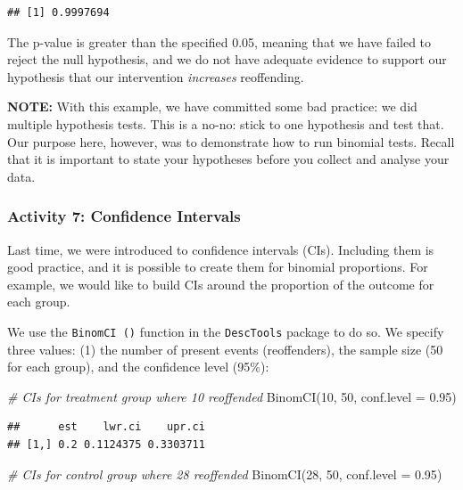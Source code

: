 \documentclass[
]{book}
\newenvironment{Shaded}{\begin{snugshade}}{\end{snugshade}}
\newcommand{\AttributeTok}[1]{\textcolor[rgb]{0.77,0.63,0.00}{#1}}
\newcommand{\CommentTok}[1]{\textcolor[rgb]{0.56,0.35,0.01}{\textit{#1}}}
\newcommand{\DecValTok}[1]{\textcolor[rgb]{0.00,0.00,0.81}{#1}}
\newcommand{\FloatTok}[1]{\textcolor[rgb]{0.00,0.00,0.81}{#1}}
\newcommand{\FunctionTok}[1]{\textcolor[rgb]{0.00,0.00,0.00}{#1}}
\newcommand{\NormalTok}[1]{#1}
\begin{document}
\begin{verbatim}
## [1] 0.9997694
\end{verbatim}

The p-value is greater than the specified 0.05, meaning that we have failed to reject the null hypothesis, and we do not have adequate evidence to support our hypothesis that our intervention \emph{increases} reoffending.

\textbf{NOTE:} With this example, we have committed some bad practice: we did multiple hypothesis tests. This is a no-no: stick to one hypothesis and test that. Our purpose here, however, was to demonstrate how to run binomial tests. Recall that it is important to state your hypotheses before you collect and analyse your data.

\hypertarget{activity-7-confidence-intervals}{%
\subsubsection{Activity 7: Confidence Intervals}\label{activity-7-confidence-intervals}}

Last time, we were introduced to confidence intervals (CIs). Including them is good practice, and it is possible to create them for binomial proportions. For example, we would like to build CIs around the proportion of the outcome for each group.

We use the \texttt{BinomCI\ ()} function in the \texttt{DescTools} package to do so. We specify three values: (1) the number of present events (reoffenders), the sample size (50 for each group), and the confidence level (95\%):

\begin{Shaded}
\begin{Highlighting}[]
\CommentTok{\# CIs for treatment group where 10 reoffended}
\FunctionTok{BinomCI}\NormalTok{(}\DecValTok{10}\NormalTok{, }\DecValTok{50}\NormalTok{, }\AttributeTok{conf.level =} \FloatTok{0.95}\NormalTok{)}
\end{Highlighting}
\end{Shaded}

\begin{verbatim}
##      est    lwr.ci    upr.ci
## [1,] 0.2 0.1124375 0.3303711
\end{verbatim}

\begin{Shaded}
\begin{Highlighting}[]
\CommentTok{\# CIs for control group where 28 reoffended}
\FunctionTok{BinomCI}\NormalTok{(}\DecValTok{28}\NormalTok{, }\DecValTok{50}\NormalTok{, }\AttributeTok{conf.level =} \FloatTok{0.95}\NormalTok{)}
\end{Highlighting}
\end{Shaded}
\end{document}
